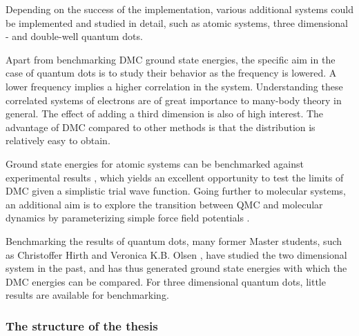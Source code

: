 Depending on the success of the implementation, various additional systems could be implemented and studied in detail, such as atomic systems, three dimensional - and double-well quantum dots. 

Apart from benchmarking DMC ground state energies, the specific aim in the case of quantum dots is to study their behavior as the frequency is lowered. A lower frequency implies a higher correlation in the system. Understanding these correlated systems of electrons are of great importance to many-body theory in general. The effect of adding a third dimension is also of high interest. The advantage of DMC compared to other methods is that the distribution is relatively easy to obtain.

Ground state energies for atomic systems can be benchmarked against experimental results \cite{H_He_exact, ExactMolecules, AtomsExact, KryptonExact}, which yields an excellent opportunity to test the limits of DMC given a simplistic trial wave function. Going further to molecular systems, an additional aim is to explore the transition between QMC and molecular dynamics by parameterizing simple force field potentials \cite{forcesQMC}.

Benchmarking the results of quantum dots, many former Master students, such as Christoffer Hirth \cite{Hirth} and Veronica K.B. Olsen \cite{Olsen}, have studied the two dimensional system in the past, and has thus generated ground state energies with which the DMC energies can be compared. For three dimensional quantum dots, little results are available for benchmarking.

\subsubsection{The structure of the thesis}

